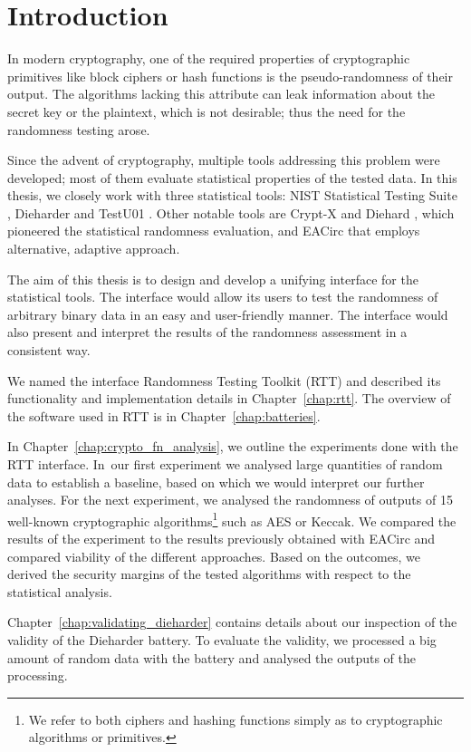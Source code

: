 \documentclass[
  digital,  	%
  color,		%
  oneside,   	%
  12pt,
  nocover,
  notable,
  nolof,
  nolot,
]{fithesis3}
\theoremstyle{definition}
\theoremstyle{remark}
\begin{document}
\chapter{Introduction}
In modern cryptography, one of the required properties of cryptographic primitives like block ciphers or hash functions is the pseudo-randomness of their output. The algorithms lacking this attribute can leak information about the secret key or the plaintext, which is not desirable; thus the need for the randomness testing arose.

Since the advent of cryptography, multiple tools addressing this problem were developed; most of them evaluate statistical properties of the tested data. In this thesis, we closely work with three statistical tools: NIST Statistical Testing Suite \cite{nist-sts}, Dieharder \cite{dieharder} and TestU01 \cite{testu01-paper}. Other notable tools are Crypt-X \cite{crypt-x} and Diehard \cite{diehard}, which pioneered the statistical randomness evaluation, and EACirc \cite{eacirc-github} that employs alternative, adaptive approach.

The aim of this thesis is to design and develop a unifying interface for the statistical tools. The interface would allow its users to test the randomness of arbitrary binary data in an easy and user-friendly manner. The interface would also present and interpret the results of the randomness assessment in a consistent way. 

We named the interface Randomness Testing Toolkit (RTT) \cite{rtt-github} and described its functionality and implementation details in Chapter~\ref{chap:rtt}. The overview of the software used in RTT is in Chapter~\ref{chap:batteries}. 

In Chapter~\ref{chap:crypto_fn_analysis}, we outline the experiments done with the RTT interface. In~our first experiment we analysed large quantities of random data to establish a baseline, based on which we would interpret our further analyses. For the next experiment, we analysed the randomness of outputs of 15 well-known cryptographic algorithms\footnote{We refer to both ciphers and hashing functions simply as to cryptographic algorithms or primitives.} such as AES or Keccak. We compared the results of the experiment to the results previously obtained with EACirc and compared viability of the different approaches. Based on the outcomes, we derived the security margins of the tested algorithms with respect to the statistical analysis.

Chapter~\ref{chap:validating_dieharder} contains details about our inspection of the validity of the Dieharder battery. To evaluate the validity, we processed a big amount of random data with the battery and analysed the outputs of the processing.
\end{document}
